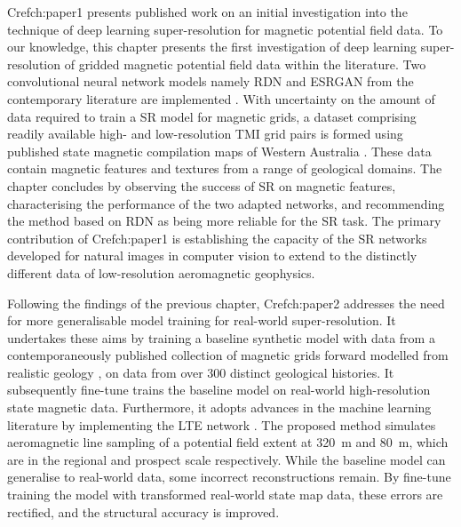 \documentclass[manuscript.tex]{subfiles}
\begin{document}
Cref{ch:paper1} presents published work on an initial investigation into the technique of deep learning super-resolution for magnetic potential field data.
To our knowledge, this chapter presents the first investigation of deep learning super-resolution of gridded magnetic potential field data within the literature.
Two convolutional neural network models namely RDN and ESRGAN from the contemporary literature are implemented \parencite{zhangResidualDenseNetwork2018,limEnhancedDeepResidual2017}.
With uncertainty on the amount of data required to train a SR model for magnetic grids, a dataset comprising readily available high- and low-resolution TMI grid pairs is formed using published state magnetic compilation maps of Western Australia \parencite{brett20MagneticMerged2020}.
These data contain magnetic features and textures from a range of geological domains.
The chapter concludes by observing the success of SR on magnetic features, characterising the performance of the two adapted networks, and recommending the method based on RDN as being more reliable for the SR task.
The primary contribution of Cref{ch:paper1} is establishing the capacity of the SR networks developed for natural images in computer vision to extend to the distinctly different data of low-resolution aeromagnetic geophysics.

Following the findings of the previous chapter, Cref{ch:paper2} addresses the need for more generalisable model training for real-world super-resolution.
It undertakes these aims by training a baseline synthetic model with data from a contemporaneously published collection of magnetic grids forward modelled from realistic geology \parencite{jessellNoddyverseMassiveData2022}, on data from over \num{300} distinct geological histories.
It subsequently fine-tune trains the baseline model on real-world high-resolution state magnetic data.
Furthermore, it adopts advances in the machine learning literature by implementing the LTE network \parencite{leeLocalTextureEstimator2022}.
The proposed method simulates aeromagnetic line sampling of a potential field extent at \qty{320}{\m} and \qty{80}{\m}, which are in the regional and prospect scale respectively.
While the baseline model can generalise to real-world data, some incorrect reconstructions remain.
By fine-tune training the model with transformed real-world state map data, these errors are rectified, and the structural accuracy is improved.
\end{document}
